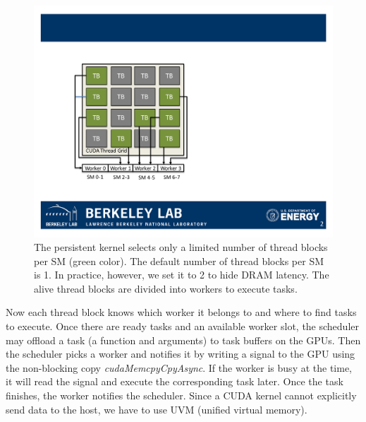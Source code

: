 \begin{figure}[htb]
\centering
\includegraphics[width=.35\textwidth]{figures/kernel_init.pdf}
\caption{The persistent kernel selects only a limited number of thread blocks per SM (green color). The default number of thread blocks per SM is 1. 
In practice, however, we set it to 2 to hide DRAM latency.
The alive thread blocks are divided into workers to execute tasks.}
\label{fig:kernel}
\end{figure}

Now each thread block knows which worker it belongs to and where to find tasks to execute.
Once there are ready tasks and an available worker slot, the scheduler may offload a task (a function and arguments) to task buffers on the GPUs.
Then the scheduler picks a worker and notifies it by writing a signal to the GPU using the non-blocking copy {\em cudaMemcpyCpyAsync}.
If the worker is busy at the time, it will read the signal and execute the corresponding task later.
Once the task finishes, the worker notifies the scheduler.
Since a CUDA kernel cannot explicitly send data to the host, we have to use UVM (unified virtual memory).
